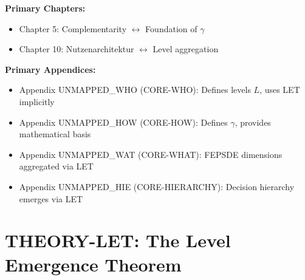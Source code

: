 \begin{tcolorbox}[colback=purple!5!white, colframe=purple!75!black,
    title=Chapter Linkage]

\textbf{Primary Chapters:}
\begin{itemize}[nosep]
\item Chapter 5: Complementarity $\leftrightarrow$ Foundation of $\gamma$
\item Chapter 10: Nutzenarchitektur $\leftrightarrow$ Level aggregation
\end{itemize}

\textbf{Primary Appendices:}
\begin{itemize}[nosep]
\item Appendix UNMAPPED_WHO (CORE-WHO): Defines levels $L$, uses LET implicitly
\item Appendix UNMAPPED_HOW (CORE-HOW): Defines $\gamma$, provides mathematical basis
\item Appendix UNMAPPED_WAT (CORE-WHAT): FEPSDE dimensions aggregated via LET
\item Appendix UNMAPPED_HIE (CORE-HIERARCHY): Decision hierarchy emerges via LET
\end{itemize}

\end{tcolorbox}


\chapter{THEORY-LET: The Level Emergence Theorem}
\label{app:theory-let}


\begin{abstract}
Why is a team more than a collection of individuals? Why does a family generate
welfare beyond the sum of its members? This appendix provides a formal answer:
the \textbf{Level Emergence Theorem (LET)}. We prove that when complementarity
is positive ($\bar{\gamma} > 0$), aggregate utility at level $L$ strictly exceeds
the sum of utilities at level $UNMAPPED_ACE-1$. This ``emergence premium'' $\mathcal{E}$
is quantifiable and depends on the variance of member utilities and the strength
of complementarity. The theorem provides the mathematical foundation for the
EBF framework's treatment of multi-level welfare aggregation.
\end{abstract}

